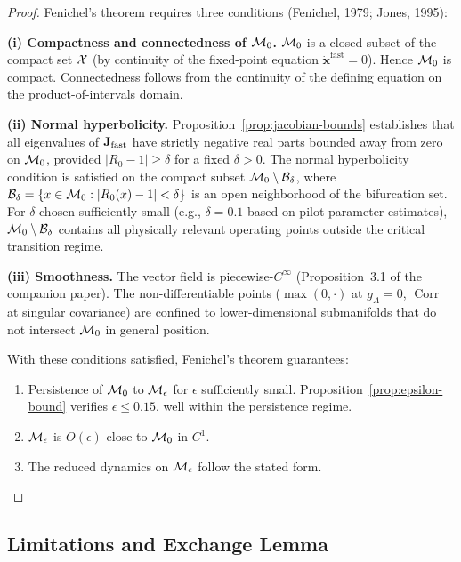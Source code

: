 \begin{proof}
Fenichel's theorem requires three conditions (Fenichel, 1979; Jones, 1995):

\textbf{(i) Compactness and connectedness of $\mathcal{M}_0$.}
$\mathcal{M}_0$ is a closed subset of the compact set $\mathcal{X}$ (by continuity of the
fixed-point equation $\dot{\mathbf{x}}^{\mathrm{fast}} = 0$). Hence $\mathcal{M}_0$
is compact. Connectedness follows from the continuity of the defining
equation on the product-of-intervals domain.

\textbf{(ii) Normal hyperbolicity.}
Proposition~\ref{prop:jacobian-bounds} establishes that all eigenvalues
of $\mathbf{J}_{\mathrm{fast}}$ have strictly negative real parts bounded away from zero on
$\mathcal{M}_0$, provided $|R_0 - 1| \geq \delta$ for a fixed $\delta > 0$.
The normal hyperbolicity condition is satisfied on the compact subset
$\mathcal{M}_0 \setminus \mathcal{B}_\delta$, where
$\mathcal{B}_\delta = \{x \in \mathcal{M}_0 : |R_0(x) - 1| < \delta\}$ is an
open neighborhood of the bifurcation set. For $\delta$ chosen
sufficiently small (e.g., $\delta = 0.1$ based on pilot parameter
estimates), $\mathcal{M}_0 \setminus \mathcal{B}_\delta$ contains all
physically relevant operating points outside the critical transition
regime.

\textbf{(iii) Smoothness.}
The vector field is piecewise-$C^\infty$ (Proposition~3.1 of the companion
paper). The non-differentiable points ($\max(0,\cdot)$ at $g_A = 0$,
$\operatorname{Corr}$ at singular covariance) are confined to lower-dimensional
submanifolds that do not intersect $\mathcal{M}_0$ in general position.

With these conditions satisfied, Fenichel's theorem guarantees:
\begin{enumerate}
\item Persistence of $\mathcal{M}_0$ to $\mathcal{M}_\epsilon$ for $\epsilon$ sufficiently small.
  Proposition~\ref{prop:epsilon-bound} verifies $\epsilon \leq 0.15$,
  well within the persistence regime.
\item $\mathcal{M}_\epsilon$ is $O(\epsilon)$-close to $\mathcal{M}_0$ in $C^1$.
\item The reduced dynamics on $\mathcal{M}_\epsilon$ follow the stated form.
\end{enumerate}
\end{proof}

\subsection{Limitations and Exchange Lemma}
\label{sec:exchange-lemma}

